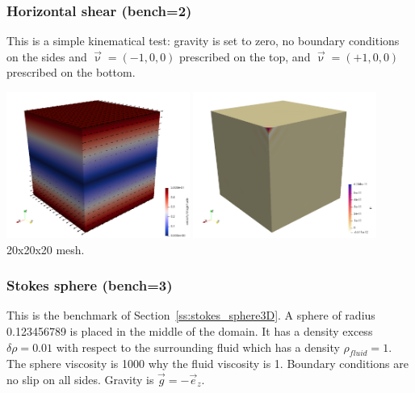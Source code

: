 \subsubsection*{Horizontal shear (bench=2)}

This is a simple kinematical test: gravity is set to zero, no boundary 
conditions on the sides and $\vec\upnu=(-1,0,0)$ prescribed on the top, and 
$\vec\upnu=(+1,0,0)$ prescribed on the bottom.

\begin{center}
\includegraphics[width=6cm]{python_codes/fieldstone_82/results/bench2/vel}
\includegraphics[width=6cm]{python_codes/fieldstone_82/results/bench2/press}\\
{\captionfont 20x20x20 mesh.} 
\end{center}

\subsubsection*{Stokes sphere (bench=3)}

This is the benchmark of Section~\ref{ss:stokes_sphere3D}.
A sphere of radius 0.123456789 is placed in the middle of the domain. 
It has a density excess $\delta\rho=0.01$
with respect to the surrounding fluid which has a density $\rho_{fluid}=1$. 
The sphere viscosity is 1000 why the fluid viscosity is 1.
Boundary conditions are no slip on all sides. Gravity is $\vec{g}=-\vec{e}_z$.

